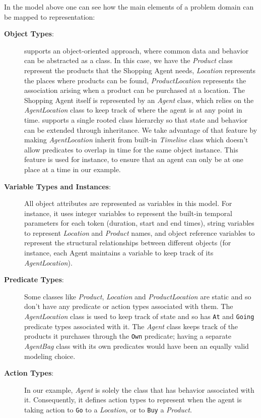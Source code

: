 In the model above one can see how the main elements of a problem domain
can be mapped to \eus representation:

\begin{description}

\item[\textbf{Object Types}:] \nd supports an object-oriented
  approach, where common data and behavior can be abstracted as a
  class. In this case, we have the \textit{Product} class represent
  the products that the Shopping Agent needs, \textit{Location}
  represents the places where products can be found,
  \textit{ProductLocation} represents the association arising when a
  product can be purchased at a location. The Shopping Agent itself is
  represented by an \textit{Agent} class, which relies on the
  \textit{AgentLocation} class to keep track of where the agent is at
  any point in time. \nd supports a single rooted class
  hierarchy so that state and behavior can be extended through
  inheritance. We take advantage of that feature by making
  \textit{AgentLocation} inherit from \eus built-in \textit{Timeline}
  class which doesn't allow predicates to overlap in time for the same
  object instance. This feature is used for instance, to ensure that
  an agent can only be at one place at a time in our example.

\item[\textbf{Variable Types and Instances}:] All object attributes
  are represented as variables in this model. For instance, it uses
  integer variables to represent the built-in temporal parameters for
  each token (duration, start and end times), string
  variables to represent \textit{Location} and \textit{Product} names,
  and object reference variables to represent the structural
  relationships between different objects (for instance, each Agent
  maintains a variable to keep track of its \textit{AgentLocation}).

\item[\textbf{Predicate Types}:] Some classes like \textit{Product},
  \textit{Location} and \textit{ProductLocation} are static and so
  don't have any predicate or action types associated with them. The
  \textit{AgentLocation} class is used to keep track of state and so
  has \texttt{At} and \texttt{Going} predicate types associated with
  it. The \textit{Agent} class keeps track of the products it
  purchases through the \texttt{Own} predicate; having a separate
  \textit{AgentBag} class with its own predicates would have been an
  equally valid modeling choice.

\item[\textbf{Action Types}:] In our example, \textit{Agent} is solely
  the class that has behavior associated with it. Consequently, it
  defines action types to represent when the agent is taking action to
  \texttt{Go} to a \textit{Location}, or to \texttt{Buy} a
  \textit{Product}. 
  
\end{description}

